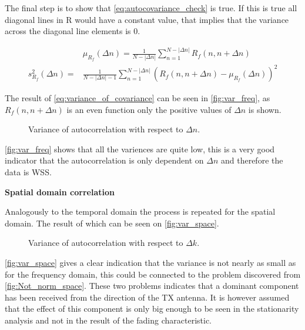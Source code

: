The final step is to show that \autoref{eq:autocovariance_check} is true. If this is true all diagonal lines in R would have a constant value, that implies that the variance across the diagonal line elements is 0. 

\begin{align}
&\mu_{R_f}(\Delta n) = \frac{1}{N-|\Delta n|}\sum_{n = 1}^{N-|\Delta n|} R_f(n,n+\Delta n) \label{EQcor}\\
s_{R_f}^2(\Delta n) = &\frac{1}{N-|\Delta n|-1}\sum_{n = 1}^{N-|\Delta n|} \left( R_f(n,n+\Delta n) - \mu_{R_f}(\Delta n) \right)^2 \label{eq:variance_of_covariance}
\end{align}
\begin{where}
\end{where}

The result of \autoref{eq:variance_of_covariance} can be seen in \autoref{fig:var_freq}, as $R_f(n,n+\Delta n)$ is an even function only the positive values of $\Delta n$ is shown.

\begin{figure}[H]
\centering

\caption{Variance of autocorrelation with respect to $\Delta n$.}
\label{fig:var_freq}
\end{figure}

\autoref{fig:var_freq} shows that all the variences are quite low, this is a very good indicator that the autocorrelation is only dependent on $\Delta n$ and therefore the data is WSS.

\textbf{Spatial domain correlation}

Analogously to the temporal domain the process is repeated for the spatial domain. The result of which can be seen on \autoref{fig:var_space}.

\begin{figure}[H]
\centering

\caption{Variance of autocorrelation with respect to $\Delta k$.}
\label{fig:var_space}
\end{figure}

\autoref{fig:var_space} gives a clear indication that the variance is not nearly as small as for the frequency domain, this could be connected to the problem discovered from \autoref{fig:Not_norm_space}. These two problems indicates that a dominant component has been received from the direction of the TX antenna. It is however assumed that the effect of this component is only big enough to be seen in the stationarity analysis and not in the result of the fading characteristic.
